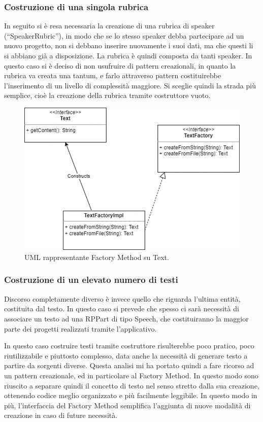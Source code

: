 \documentclass[a4paper,12pt]{report}
\begin{document}
\subsubsection{Costruzione di una singola rubrica}
In seguito si è resa necessaria la creazione di una rubrica di speaker (“SpeakerRubric”), in modo che se lo stesso speaker debba partecipare ad un nuovo progetto, non si debbano inserire nuovamente i suoi dati, ma che questi li si abbiano già a disposizione. La rubrica è quindi composta da tanti speaker. In questo caso si è deciso di non usufruire di pattern creazionali, in quanto la rubrica va creata una tantum, e farlo attraverso pattern costituirebbe l’inserimento di un livello di complessità maggiore. Si sceglie quindi la strada più semplice, cioè la creazione della rubrica tramite costruttore vuoto.

\begin{figure}[h]
\centering{}
\includegraphics[width=\textwidth,scale=1]{img/text.png}
\caption{UML rappresentante Factory Method su Text.}
\end{figure}

\subsubsection{Costruzione di un elevato numero di testi}
Discorso completamente diverso è invece quello che riguarda l’ultima entità, costituita dal testo. In questo caso si prevede che spesso ci sarà necessità di associare un testo ad una RPPart di tipo Speech, che costituiranno la maggior parte dei progetti realizzati tramite l’applicativo. 

In questo caso costruire testi tramite costruttore risulterebbe poco pratico, poco riutilizzabile e piuttosto complesso, data anche la necessità di generare testo a partire da sorgenti diverse. Questa analisi mi ha portato quindi a fare ricorso ad un pattern creazionale, ed in particolare al Factory Method. In questo modo sono riuscito a separare quindi il concetto di testo nel senso stretto dalla sua creazione, ottenendo codice meglio organizzato e più facilmente leggibile. In questo modo in più, l’interfaccia del Factory Method semplifica l’aggiunta di nuove modalità di creazione in caso di future necessità. 
\end{document}
